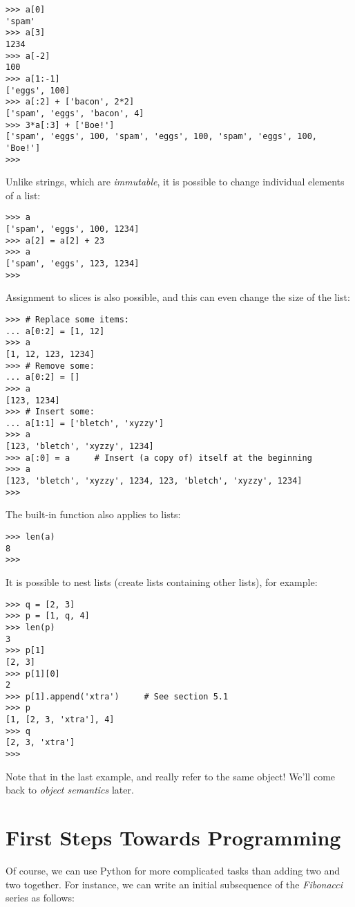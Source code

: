 \bcode\begin{verbatim}
>>> a[0]
'spam'
>>> a[3]
1234
>>> a[-2]
100
>>> a[1:-1]
['eggs', 100]
>>> a[:2] + ['bacon', 2*2]
['spam', 'eggs', 'bacon', 4]
>>> 3*a[:3] + ['Boe!']
['spam', 'eggs', 100, 'spam', 'eggs', 100, 'spam', 'eggs', 100, 'Boe!']
>>> 
\end{verbatim}\ecode
%
Unlike strings, which are \emph{immutable}, it is possible to change
individual elements of a list:

\bcode\begin{verbatim}
>>> a
['spam', 'eggs', 100, 1234]
>>> a[2] = a[2] + 23
>>> a
['spam', 'eggs', 123, 1234]
>>>
\end{verbatim}\ecode
%
Assignment to slices is also possible, and this can even change the size
of the list:

\bcode\begin{verbatim}
>>> # Replace some items:
... a[0:2] = [1, 12]
>>> a
[1, 12, 123, 1234]
>>> # Remove some:
... a[0:2] = []
>>> a
[123, 1234]
>>> # Insert some:
... a[1:1] = ['bletch', 'xyzzy']
>>> a
[123, 'bletch', 'xyzzy', 1234]
>>> a[:0] = a     # Insert (a copy of) itself at the beginning
>>> a
[123, 'bletch', 'xyzzy', 1234, 123, 'bletch', 'xyzzy', 1234]
>>> 
\end{verbatim}\ecode
%
The built-in function  also applies to lists:

\bcode\begin{verbatim}
>>> len(a)
8
>>> 
\end{verbatim}\ecode
%
It is possible to nest lists (create lists containing other lists),
for example:

\bcode\begin{verbatim}
>>> q = [2, 3]
>>> p = [1, q, 4]
>>> len(p)
3
>>> p[1]
[2, 3]
>>> p[1][0]
2
>>> p[1].append('xtra')     # See section 5.1
>>> p
[1, [2, 3, 'xtra'], 4]
>>> q
[2, 3, 'xtra']
>>>
\end{verbatim}\ecode
%
Note that in the last example,  and  really refer to
the same object!  We'll come back to \emph{object semantics} later.

\section{First Steps Towards Programming}

Of course, we can use Python for more complicated tasks than adding
two and two together.  For instance, we can write an initial
subsequence of the \emph{Fibonacci} series as follows:

